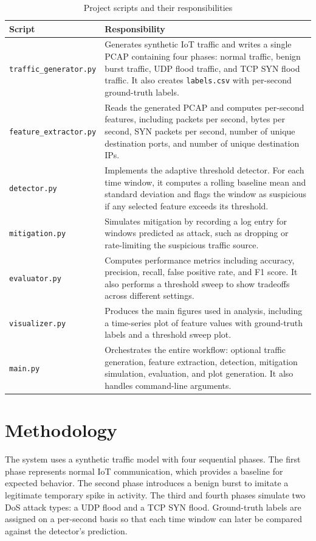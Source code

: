 \documentclass[11pt]{article}
\begin{document}
\begin{table}[H]
\centering
\caption{Project scripts and their responsibilities}
\label{tab:modules}
\begin{tabular}{>{\raggedright\arraybackslash}p{4.2cm} >{\raggedright\arraybackslash}p{10cm}}
\toprule
\textbf{Script} & \textbf{Responsibility} \\
\midrule
\texttt{traffic\_generator.py} & Generates synthetic IoT traffic and writes a single PCAP containing four phases: normal traffic, benign burst traffic, UDP flood traffic, and TCP SYN flood traffic. It also creates \texttt{labels.csv} with per-second ground-truth labels. \\
\texttt{feature\_extractor.py} & Reads the generated PCAP and computes per-second features, including packets per second, bytes per second, SYN packets per second, number of unique destination ports, and number of unique destination IPs. \\
\texttt{detector.py} & Implements the adaptive threshold detector. For each time window, it computes a rolling baseline mean and standard deviation and flags the window as suspicious if any selected feature exceeds its threshold. \\
\texttt{mitigation.py} & Simulates mitigation by recording a log entry for windows predicted as attack, such as dropping or rate-limiting the suspicious traffic source. \\
\texttt{evaluator.py} & Computes performance metrics including accuracy, precision, recall, false positive rate, and F1 score. It also performs a threshold sweep to show tradeoffs across different settings. \\
\texttt{visualizer.py} & Produces the main figures used in analysis, including a time-series plot of feature values with ground-truth labels and a threshold sweep plot. \\
\texttt{main.py} & Orchestrates the entire workflow: optional traffic generation, feature extraction, detection, mitigation simulation, evaluation, and plot generation. It also handles command-line arguments. \\
\bottomrule
\end{tabular}
\end{table}

\section*{Methodology}
The system uses a synthetic traffic model with four sequential phases. The first phase represents normal IoT communication, which provides a baseline for expected behavior. The second phase introduces a benign burst to imitate a legitimate temporary spike in activity. The third and fourth phases simulate two DoS attack types: a UDP flood and a TCP SYN flood. Ground-truth labels are assigned on a per-second basis so that each time window can later be compared against the detector's prediction.
\end{document}
